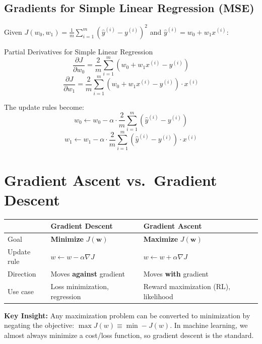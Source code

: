 \documentclass[12pt,a4paper]{report}
\begin{document}
\subsection{Gradients for Simple Linear Regression (MSE)}

Given $J(w_0, w_1) = \frac{1}{m}\sum_{i=1}^m (\hat{y}^{(i)} - y^{(i)})^2$ and $\hat{y}^{(i)} = w_0 + w_1 x^{(i)}$:

\begin{formulabox}{Partial Derivatives for Simple Linear Regression}
\[
\frac{\partial J}{\partial w_0} = \frac{2}{m} \sum_{i=1}^m \left( w_0 + w_1 x^{(i)} - y^{(i)} \right)
\]
\[
\frac{\partial J}{\partial w_1} = \frac{2}{m} \sum_{i=1}^m \left( w_0 + w_1 x^{(i)} - y^{(i)} \right) \cdot x^{(i)}
\]
\end{formulabox}

The update rules become:
\[
w_0 \leftarrow w_0 - \alpha \cdot \frac{2}{m} \sum_{i=1}^m (\hat{y}^{(i)} - y^{(i)})
\]
\[
w_1 \leftarrow w_1 - \alpha \cdot \frac{2}{m} \sum_{i=1}^m (\hat{y}^{(i)} - y^{(i)}) \cdot x^{(i)}
\]

\section{Gradient Ascent vs.\ Gradient Descent}

\begin{center}
\begin{tabular}{lll}
\toprule
 & \textbf{Gradient Descent} & \textbf{Gradient Ascent} \\
\midrule
Goal & \textbf{Minimize} $J(\mathbf{w})$ & \textbf{Maximize} $J(\mathbf{w})$ \\
Update rule & $w \leftarrow w - \alpha \nabla J$ & $w \leftarrow w + \alpha \nabla J$ \\
Direction & Moves \textbf{against} gradient & Moves \textbf{with} gradient \\
Use case & Loss minimization, regression & Reward maximization (RL), likelihood \\
\bottomrule
\end{tabular}
\end{center}

\begin{keybox}
\textbf{Key Insight:} Any maximization problem can be converted to minimization by negating the objective: $\max J(w) \equiv \min -J(w)$. In machine learning, we almost always minimize a cost/loss function, so gradient descent is the standard.
\end{keybox}
\end{document}
